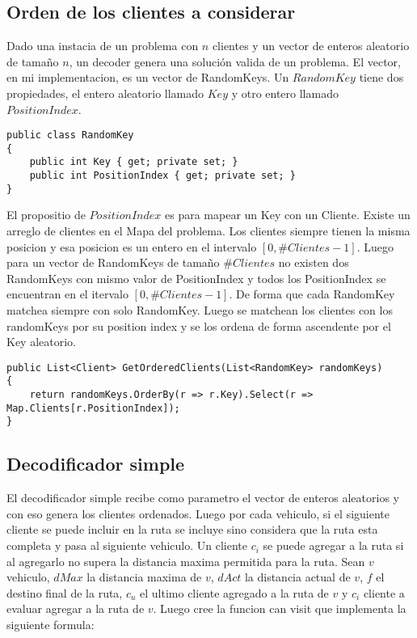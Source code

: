 \subsection{Orden de los clientes a considerar}

Dado una instacia de un problema con $n$ clientes y un vector de enteros aleatorio de tamaño $n$, un decoder genera una solución valida de un problema. El vector, en mi implementacion, es un vector de RandomKeys. Un $RandomKey$ tiene dos propiedades, el entero aleatorio llamado $Key$ y otro entero llamado $PositionIndex$. 

\bigskip

\begin{lstlisting} 
public class RandomKey
{        
	public int Key { get; private set; }
	public int PositionIndex { get; private set; }
}
\end{lstlisting}

\bigskip

El propositio de $PositionIndex$ es para mapear un Key con un Cliente. Existe un arreglo de clientes en el Mapa del problema. Los clientes siempre tienen la misma posicion y esa posicion es un entero en el intervalo $[0, \#Clientes-1]$. Luego para un vector de RandomKeys de tamaño $\#Clientes$ no existen dos RandomKeys con mismo valor de PositionIndex y todos los PositionIndex se encuentran en el itervalo $[0, \#Clientes-1]$. De forma que cada RandomKey matchea siempre con solo RandomKey. Luego se matchean los clientes con los randomKeys por su position index y se los ordena de forma ascendente por el Key aleatorio.

\bigskip

\begin{lstlisting} 
public List<Client> GetOrderedClients(List<RandomKey> randomKeys)
{        
	return randomKeys.OrderBy(r => r.Key).Select(r => Map.Clients[r.PositionIndex]);
}
\end{lstlisting}

\subsection{Decodificador simple}

El decodificador simple recibe como parametro el vector de enteros aleatorios y con eso genera los clientes ordenados. Luego por cada vehiculo, si el siguiente cliente se puede incluir en la ruta se incluye sino considera que la ruta esta completa y pasa al siguiente vehiculo. Un cliente $c_i$ se puede agregar a la ruta si al agregarlo no supera la distancia maxima permitida para la ruta. Sean $v$ vehiculo, $dMax$ la distancia maxima de $v$, $dAct$ la distancia actual de $v$, $f$ el destino final de la ruta, $c_u$ el ultimo cliente agregado a la ruta de $v$ y $c_i$ cliente a evaluar agregar a la ruta de $v$. Luego cree la funcion can visit que implementa la siguiente formula:

